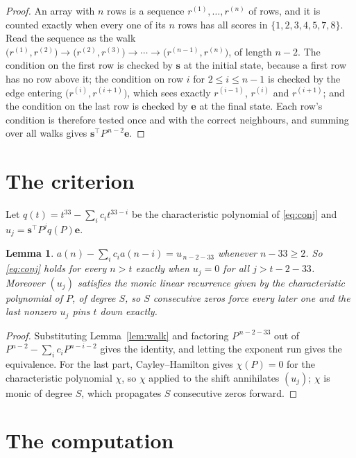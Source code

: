 \documentclass[11pt,a4paper]{article}
\theoremstyle{plain}
\newtheorem{lemma}[theorem]{Lemma}
\theoremstyle{definition}
\begin{document}
\begin{proof}
An array with $n$ rows is a sequence $r^{(1)},\dots,r^{(n)}$ of rows, and it is counted
exactly when every one of its $n$ rows has all scores in $\{1,2,3,4,5,7,8\}$. Read the sequence as the
walk $\bigl(r^{(1)},r^{(2)}\bigr)\to\bigl(r^{(2)},r^{(3)}\bigr)\to\cdots\to
\bigl(r^{(n-1)},r^{(n)}\bigr)$, of length $n-2$. The condition on the first row is
checked by $\mathbf{s}$ at the initial state, because a first row has no row above it; the
condition on row $i$ for $2\le i\le n-1$ is checked by the edge entering
$\bigl(r^{(i)},r^{(i+1)}\bigr)$, which sees exactly $r^{(i-1)}$, $r^{(i)}$ and
$r^{(i+1)}$; and the condition on the last row is checked by $\mathbf{e}$ at the final
state. Each row's condition is therefore tested once and with the correct neighbours, and
summing over all walks gives $\mathbf{s}^{\!\top}P^{\,n-2}\mathbf{e}$.
\end{proof}

\section{The criterion}

Let $q(t)=t^{33}-\sum_i c_i t^{33-i}$ be the characteristic polynomial of
\eqref{eq:conj} and $u_j=\mathbf{s}^{\!\top}P^{j}q(P)\mathbf{e}$.

\begin{lemma}\label{lem:crit}
$a(n)-\sum_i c_i a(n-i)=u_{\,n-2-33}$ whenever $n-33\ge2$. So \eqref{eq:conj}
holds for every $n>t$ exactly when $u_j=0$ for all $j>t-2-33$. Moreover $(u_j)$
satisfies the monic linear recurrence given by the characteristic polynomial of $P$, of
degree $S$, so $S$ consecutive zeros force every later one and the last nonzero $u_j$ pins
$t$ down exactly.
\end{lemma}

\begin{proof}
Substituting Lemma~\ref{lem:walk} and factoring $P^{\,n-2-33}$ out of
$P^{n-2}-\sum_i c_i P^{n-i-2}$ gives the identity, and letting the exponent run gives the
equivalence. For the last part, Cayley--Hamilton gives $\chi(P)=0$ for the characteristic
polynomial $\chi$, so $\chi$ applied to the shift annihilates $(u_j)$; $\chi$ is monic of
degree $S$, which propagates $S$ consecutive zeros forward.
\end{proof}

\section{The computation}
\end{document}
